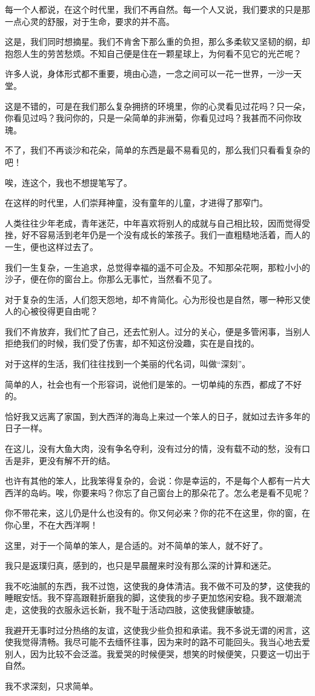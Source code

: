 \par 每一个人都说，在这个时代里，我们不再自然。每一个人又说，我们要求的只是那一点心灵的舒服，对于生命，要求的并不高。
\par 这是，我们同时想摘星。我们不肯舍下那么重的负担，那么多柔软又坚韧的纲，却抱怨人生的劳苦愁烦。不知自己便是住在一颗星球上，为何看不见它的光芒呢？
\par 许多人说，身体形式都不重要，境由心造，一念之间可以一花一世界，一沙一天堂。
\par 这是不错的，可是在我们那么复杂拥挤的环境里，你的心灵看见过花吗？只一朵，你看见过吗？我问你的，只是一朵简单的非洲菊，你看见过吗？我甚而不问你玫瑰。
\par 不了，我们不再谈沙和花朵，简单的东西是最不易看见的，那么我们只看看复杂的吧！
\par 唉，连这个，我也不想提笔写了。
\par 在这样的时代里，人们崇拜神童，没有童年的儿童，才进得了那窄门。
\par 人类往往少年老成，青年迷茫，中年喜欢将别人的成就与自己相比较，因而觉得受挫，好不容易活到老年仍是一个没有成长的笨孩子。我们一直粗糙地活着，而人的一生，便也这样过去了。
\par 我们一生复杂，一生追求，总觉得幸福的遥不可企及。不知那朵花啊，那粒小小的沙子，便在你的窗台上。你那么无事忙，当然看不见了。
\par 对于复杂的生活，人们怨天怨地，却不肯简化。心为形役也是自然，哪一种形又使人的心被役得更自由呢？
\par 我们不肯放弃，我们忙了自己，还去忙别人。过分的关心，便是多管闲事，当别人拒绝我们的时候，我们受了伤害，却不知这份没趣，实在是自找的。
\par 对于这样的生活，我们往往找到一个美丽的代名词，叫做“深刻”。
\par 简单的人，社会也有一个形容词，说他们是笨的。一切单纯的东西，都成了不好的。
\par 恰好我又远离了家国，到大西洋的海岛上来过一个笨人的日子，就如过去许多年的日子一样。
\par 在这儿，没有大鱼大肉，没有争名夺利，没有过分的情，没有载不动的愁，没有口舌是非，更没有解不开的结。
\par 也许有其他的笨人，比我笨得复杂的，会说：你是幸运的，不是每个人都有一片大西洋的岛屿。唉，你要来吗？你忘了自己窗台上的那朵花了。怎么老是看不见呢？
\par 你不带花来，这儿仍是什么也没有的。你又何必来？你的花不在这里，你的窗，在你心里，不在大西洋啊！
\par 这里，对于一个简单的笨人，是合适的。对不简单的笨人，就不好了。
\par 我只是返璞归真，感到的，也只是早晨醒来时没有那么深的计算和迷茫。
\par 我不吃油腻的东西，我不过饱，这使我的身体清洁。我不做不可及的梦，这使我的睡眠安恬。我不穿高跟鞋折磨我的脚，这使我的步子更加悠闲安稳。我不跟潮流走，这使我的衣服永远长新，我不耻于活动四肢，这使我健康敏捷。
\par 我避开无事时过分热络的友谊，这使我少些负担和承诺。我不多说无谓的闲言，这使我觉得清畅。我尽可能不去缅怀往事，因为来时的路不可能回头。我当心地去爱别人，因为比较不会泛滥。我爱哭的时候便哭，想笑的时候便笑，只要这一切出于自然。
\par 我不求深刻，只求简单。



